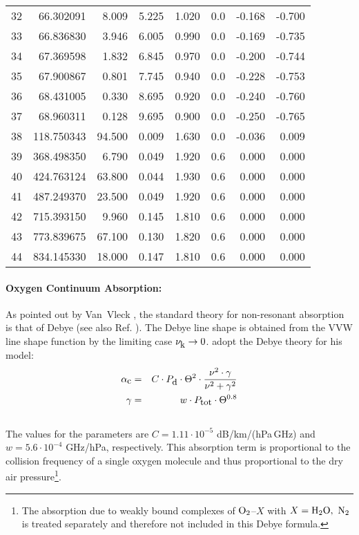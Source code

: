 \begin{longtable}{lrrrrrrr}
32 & 66.302091 &   8.009 &  5.225 &    1.020 & 0.0 &  -0.168 &   -0.700\\
33 & 66.836830 &   3.946 &  6.005 &    0.990 & 0.0 &  -0.169 &   -0.735\\
34 & 67.369598 &   1.832 &  6.845 &    0.970 & 0.0 &  -0.200 &   -0.744\\
35 & 67.900867 &   0.801 &  7.745 &    0.940 & 0.0 &  -0.228 &   -0.753\\
36 & 68.431005 &   0.330 &  8.695 &    0.920 & 0.0 &  -0.240 &   -0.760\\
37 & 68.960311 &   0.128 &  9.695 &    0.900 & 0.0 &  -0.250 &   -0.765\\
38 & 118.750343 &  94.500 &  0.009 &   1.630 & 0.0 &  -0.036 &    0.009\\
39 & 368.498350 &   6.790 &  0.049 &   1.920 & 0.6 &   0.000 &    0.000\\
40 & 424.763124 &  63.800 &  0.044 &   1.930 & 0.6 &   0.000 &    0.000\\
41 & 487.249370 &  23.500 &  0.049 &   1.920 & 0.6 &   0.000 &    0.000\\
42 & 715.393150 &   9.960 &  0.145 &   1.810 & 0.6 &   0.000 &    0.000\\
43 & 773.839675 &  67.100 &  0.130 &   1.820 & 0.6 &   0.000 &    0.000\\
44 & 834.145330 &  18.000 &  0.147 &   1.810 & 0.6 &   0.000 &    0.000\\
\end{longtable}

\paragraph{Oxygen Continuum Absorption:}
\label{levele:mpm93_o2cont}
As pointed out by Van~Vleck \citep{vv:87}, the standard theory for
non-resonant absorption is that of Debye (see also Ref. \citet{townes:55}). 
The Debye line shape is obtained from the VVW line shape function 
by the limiting case $\nu_{\mbox{\rm \small k}} \rightarrow 0$.
\citet{liebeetal:93} adopt the Debye theory for his model:
\begin{eqnarray}
  \label{eq:mpm93_o2cont}
  \alphac &=&  C \cdot \pda \cdot \Theta^2 \cdot 
               \frac{\nu^2 \cdot \gamma}{\nu^2+\gamma^2}\\
%
  \label{eq:mpm93_o2cont_1}
  \gamma  &=&  w \cdot \ptot \cdot \Theta^{0.8}\nonumber\\
\nonumber
\end{eqnarray}
The values for the parameters are $C = 1.11\cdot 10^{-5}$ dB/km/(hPa\,GHz) and 
$w = 5.6 \cdot 10^{-4}$ GHz/hPa, respectively. This absorption
term is proportional to the collision frequency of a single oxygen molecule
and thus proportional to the dry air pressure\footnote{The absorption
  due to weakly bound complexes of $\mbox{O}_2$--$X$ with $X=\mbox{H}_2\mbox{O},~\mbox{N}_2$ is 
  treated separately and therefore not included in this Debye
  formula.}.




